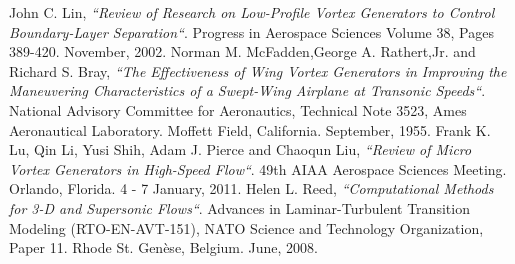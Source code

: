 \begin{thebibliography}{99}

  John C. Lin,
  \emph{``Review of Research on Low-Profile Vortex Generators to Control Boundary-Layer Separation``}. Progress in Aerospace Sciences Volume 38, Pages 389-420. November, 2002.
  Norman M. McFadden,George A. Rathert,Jr. and Richard S. Bray,
  \emph{``The Effectiveness of Wing Vortex Generators in Improving the Maneuvering Characteristics of a Swept-Wing Airplane at Transonic Speeds``}. National Advisory Committee for Aeronautics, Technical Note 3523, Ames Aeronautical Laboratory. Moffett Field, California. September, 1955.
Frank K. Lu, Qin Li, Yusi Shih, Adam J. Pierce and Chaoqun Liu,
  \emph{``Review of Micro Vortex Generators
in High-Speed Flow``}. 49th AIAA Aerospace Sciences Meeting. Orlando, Florida. 4 - 7 January, 2011.
  Helen L. Reed,
  \emph{``Computational Methods for 3-D and Supersonic Flows``}. Advances in Laminar-Turbulent Transition Modeling (RTO-EN-AVT-151), NATO Science and Technology Organization, Paper 11. Rhode St. Genèse, Belgium. June, 2008.

\end{thebibliography}
